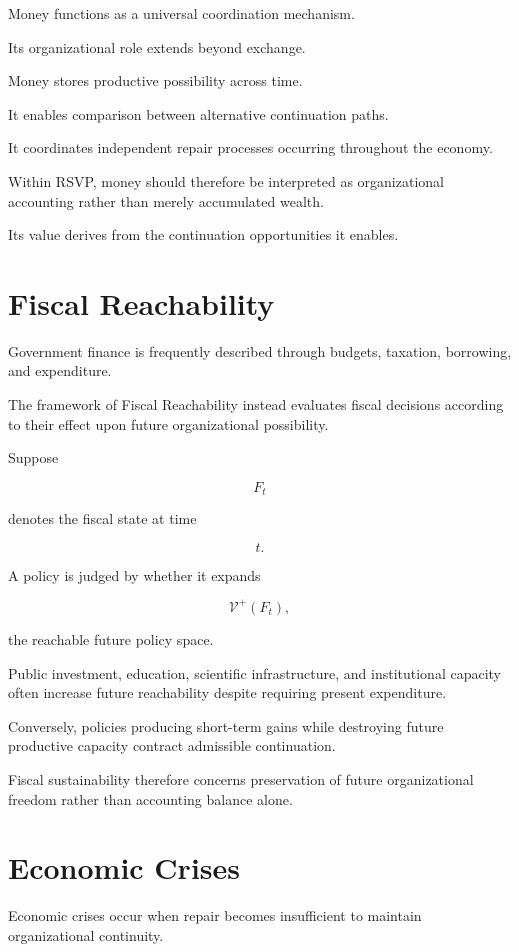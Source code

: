 \documentclass[11pt,oneside]{book}
\numberwithin{equation}{chapter}
\theoremstyle{definition}
\theoremstyle{plain}
\begin{document}
Money functions as a universal coordination mechanism.

Its organizational role extends beyond exchange.

Money stores productive possibility across time.

It enables comparison between alternative continuation paths.

It coordinates independent repair processes occurring throughout the
economy.

Within RSVP, money should therefore be interpreted as organizational
accounting rather than merely accumulated wealth.

Its value derives from the continuation opportunities it enables.

\section{Fiscal Reachability}

Government finance is frequently described through budgets, taxation,
borrowing, and expenditure.

The framework of Fiscal Reachability instead evaluates fiscal decisions
according to their effect upon future organizational possibility.

Suppose

\[
F_t
\]

denotes the fiscal state at time

\[
t.
\]

A policy is judged by whether it expands

\[
\mathcal V^+(F_t),
\]

the reachable future policy space.

Public investment, education, scientific infrastructure, and institutional
capacity often increase future reachability despite requiring present
expenditure.

Conversely, policies producing short-term gains while destroying future
productive capacity contract admissible continuation.

Fiscal sustainability therefore concerns preservation of future
organizational freedom rather than accounting balance alone.

\section{Economic Crises}

Economic crises occur when repair becomes insufficient to maintain
organizational continuity.
\end{document}

